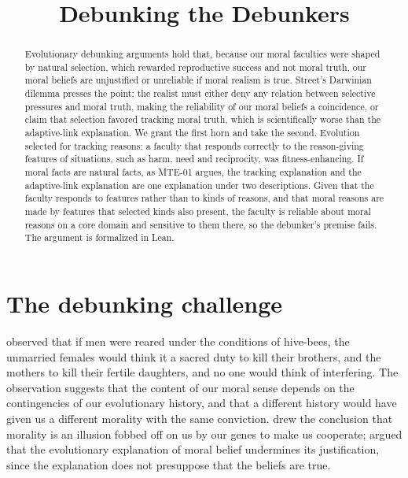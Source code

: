 \documentclass{situationist-preprint}
\title{Debunking the Debunkers}
\begin{document}
\maketitle

\begin{abstract}
Evolutionary debunking arguments hold that, because our moral faculties were shaped by natural selection, which rewarded reproductive success and not moral truth, our moral beliefs are unjustified or unreliable if moral realism is true. Street's Darwinian dilemma presses the point: the realist must either deny any relation between selective pressures and moral truth, making the reliability of our moral beliefs a coincidence, or claim that selection favored tracking moral truth, which is scientifically worse than the adaptive-link explanation. We grant the first horn and take the second. Evolution selected for tracking reasons: a faculty that responds correctly to the reason-giving features of situations, such as harm, need and reciprocity, was fitness-enhancing. If moral facts are natural facts, as MTE-01 argues, the tracking explanation and the adaptive-link explanation are one explanation under two descriptions. Given that the faculty responds to features rather than to kinds of reasons, and that moral reasons are made by features that selected kinds also present, the faculty is reliable about moral reasons on a core domain and sensitive to them there, so the debunker's premise fails. The argument is formalized in Lean.
\end{abstract}

\section{The debunking challenge}

\citet{Darwin1871} observed that if men were reared under the conditions of hive-bees, the unmarried females would think it a sacred duty to kill their brothers, and the mothers to kill their fertile daughters, and no one would think of interfering. The observation suggests that the content of our moral sense depends on the contingencies of our evolutionary history, and that a different history would have given us a different morality with the same conviction. \citet{RuseWilson1986} drew the conclusion that morality is an illusion fobbed off on us by our genes to make us cooperate; \citet{Joyce2006} argued that the evolutionary explanation of moral belief undermines its justification, since the explanation does not presuppose that the beliefs are true.
\end{document}
